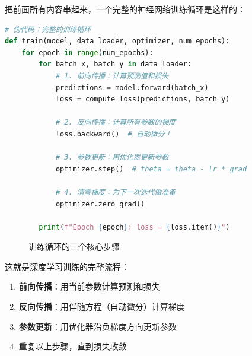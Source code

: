 把前面所有内容串起来，一个完整的神经网络训练循环是这样的：

\begin{lstlisting}[style=teaching, language=Python]
# 伪代码：完整的训练循环
def train(model, data_loader, optimizer, num_epochs):
    for epoch in range(num_epochs):
        for batch_x, batch_y in data_loader:
            # 1. 前向传播：计算预测值和损失
            predictions = model.forward(batch_x)
            loss = compute_loss(predictions, batch_y)
            
            # 2. 反向传播：计算所有参数的梯度
            loss.backward()  # 自动微分！
            
            # 3. 参数更新：用优化器更新参数
            optimizer.step()  # theta = theta - lr * grad
            
            # 4. 清零梯度：为下一次迭代做准备
            optimizer.zero_grad()
        
        print(f"Epoch {epoch}: loss = {loss.item()}")
\end{lstlisting}

\begin{figure}[htbp]
\centering
{}
\caption{训练循环的三个核心步骤}
\end{figure}

这就是深度学习训练的完整流程：
\begin{enumerate}
    \item \textbf{前向传播}：用当前参数计算预测和损失
    \item \textbf{反向传播}：用伴随方程（自动微分）计算梯度
    \item \textbf{参数更新}：用优化器沿负梯度方向更新参数
    \item 重复以上步骤，直到损失收敛
\end{enumerate}


